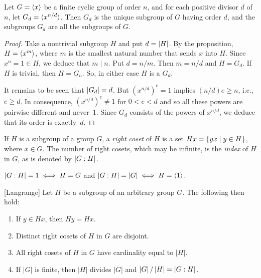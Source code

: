 \begin{cor}\label{cyclic-subgroups}
     Let $G = \langle x\rangle$ be a finite cyclic group of order $n$, and for each positive divisor $d$ of $n$, let $G_d = \langle x^{n/d}\rangle$. Then $G_d$ is the unique subgroup of $G$ having order $d$, and the subgroups $G_d$ are all the subgroups of $G$.
\end{cor}

\begin{proof} Take a nontrivial subgroup $H$ and put $d=\left\vert{H}\right\vert$. By the proposition, $H=\langle x^m\rangle$, where $m$ is the smallest natural number that sends $x$ into $H$. Since $x^n=1\in H$, we deduce that $m\mid n$. Put $d=n/m$. Then $m=n/d$ and $H=G_d$. If $H$ is trivial, then $H=G_n$. So, in either case $H$ is a $G_d$.

It remains to be seen that $\left\vert{G_d}\right\vert=d$. But $(x^{n/d})^e=1$ implies $(n/d)e\ge n$, i.e., $e\ge d$. In consequence, $(x^{n/d})^e\ne1$ for $0< e < d$ and so all these powers are pairwise different and never~$1$. Since $G_d$ consists of the powers of $x^{n/d}$, we deduce that its order is exactly~$d$.  \end{proof}

\begin{defn}\label{right-index}
    If\/ $H$ is a subgroup of a group $G$, a \textsl{right} \textsl{coset} of $H$ is a set $Hx=\{yx\mid y\in H\}$, where $x\in G$. The number of right cosets, which may be infinite, is the \textsl{index} of\/ $H$ in $G$, as is denoted by $\left\vert{G:H}\right\vert$.
\end{defn}

\begin{rem}
    $\left\vert{G:H}\right\vert=1\iff H=G$ and\/ $\left\vert{G:H}\right\vert=\left\vert{G}\right\vert\iff H=\langle1\rangle$.
\end{rem}

\begin{thm}\label{lagrange} {\rm[Langrange]}
    Let $H$ be a subgroup of an arbitrary group $G$. The following then hold:
    \begin{enumerate}[\rm a)]
    \item If\/ $y \in Hx$, then $Hy = Hx$.
    \item Distinct right cosets of\/ $H$ in\/ $G$ are disjoint.
    \item All right cosets of\/ $H$ in $G$ have cardinality equal to $|H|$.
    \item If\/ $|G|$ is finite, then $|H|$ divides $|G|$ and $\left\vert{G}\right\vert/\left\vert{H}\right\vert = \left\vert{G:H}\right\vert$.
    \end{enumerate}
\end{thm}

